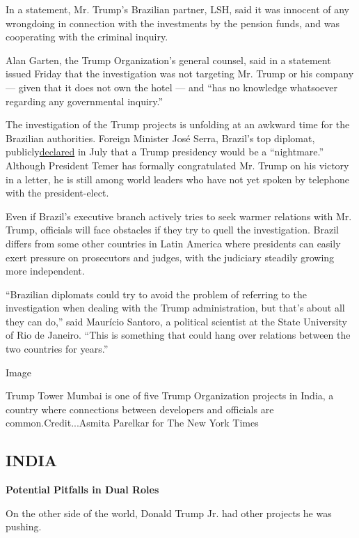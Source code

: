 In a statement, Mr. Trump's Brazilian partner, LSH, said it was innocent
of any wrongdoing in connection with the investments by the pension
funds, and was cooperating with the criminal inquiry.

Alan Garten, the Trump Organization's general counsel, said in a
statement issued Friday that the investigation was not targeting Mr.
Trump or his company --- given that it does not own the hotel --- and
``has no knowledge whatsoever regarding any governmental inquiry.''

The investigation of the Trump projects is unfolding at an awkward time
for the Brazilian authorities. Foreign Minister José Serra, Brazil's top
diplomat,
publicly\href{http://www.correiobraziliense.com.br/app/noticia/politica/2016/07/31/internas_polbraeco,542408/a-era-petista-foi-uma-era-de-retrocesso-diz-jose-serra.shtml}{declared}
in July that a Trump presidency would be a ``nightmare.'' Although
President Temer has formally congratulated Mr. Trump on his victory in a
letter, he is still among world leaders who have not yet spoken by
telephone with the president-elect.

Even if Brazil's executive branch actively tries to seek warmer
relations with Mr. Trump, officials will face obstacles if they try to
quell the investigation. Brazil differs from some other countries in
Latin America where presidents can easily exert pressure on prosecutors
and judges, with the judiciary steadily growing more independent.

``Brazilian diplomats could try to avoid the problem of referring to the
investigation when dealing with the Trump administration, but that's
about all they can do,'' said Maurício Santoro, a political scientist at
the State University of Rio de Janeiro. ``This is something that could
hang over relations between the two countries for years.''

Image

Trump Tower Mumbai is one of five Trump Organization projects in India,
a country where connections between developers and officials are
common.Credit...Asmita Parelkar for The New York Times

\hypertarget{india}{%
\subsection{INDIA}\label{india}}

\textbf{Potential Pitfalls in Dual Roles}

On the other side of the world, Donald Trump Jr. had other projects he
was pushing.

